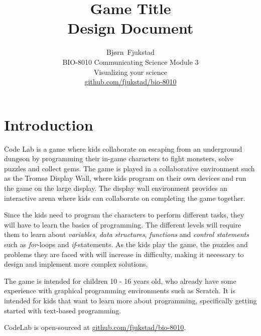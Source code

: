 \documentclass[12pt,journal,compsoc]{IEEEtran}
\begin{document}
\title{Game Title \\ Design Document}

\author{Bjørn~Fjukstad \\ BIO-8010 Communicating Science Module 3\\ Visualizing
your science \\ \url{github.com/fjukstad/bio-8010}} 

\maketitle
\vspace{-15mm}

\section{Introduction} 
Code Lab is a game where kids collaborate on escaping from an underground
dungeon by programming their in-game characters to fight monsters, solve puzzles
and collect gems. The game is played in a collaborative environment such as the
Tromsø Display Wall\cite{anshus2013nineyears}, where kids program on their own
devices and run the game on the large display. The display wall environment
provides an interactive arena where kids can collaborate on completing the game
together.

Since the kids need to program the characters to perform different tasks, they
will have to learn the basics of programming. The different levels will require
them to learn about \emph{variables}, \emph{data structures}, \emph{functions}
and \emph{control statements} such as \emph{for}-loops and \emph{if}-statements. 
As the kids play the game, the puzzles and problems they are faced with will
increase in difficulty, making it necessary to design and implement more
complex solutions. 

The game is intended for children 10 - 16 years old, who already have some
experience with graphical programming environments such as
Scratch\cite{resnick2009scratch}. It is intended for kids that want to learn
more about programming, specifically getting started with text-based
programming. 

CodeLab is open-sourced at \url{github.com/fjukstad/bio-8010}. 

\end{document}
